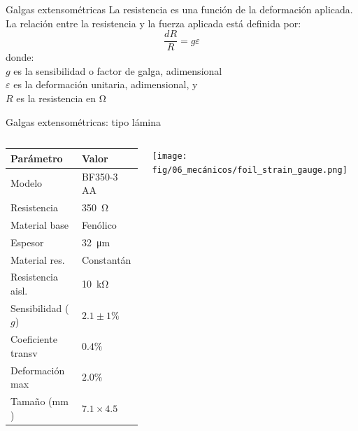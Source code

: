 \documentclass[aspectratio=169]{beamer}
\begin{document}
\begin{frame}[t]{Galgas extensométricas}
    La resistencia es una función de la deformación aplicada.
    La relación entre la resistencia y la fuerza aplicada está definida por:
    \begin{equation*}
        \dfrac{dR}{R} = g \varepsilon
    \end{equation*}
    donde:\\
    $g$ es la sensibilidad o factor de galga, adimensional\\
    $\varepsilon$ es la deformación unitaria, adimensional, y\\
    $R$ es la resistencia en $\si{\ohm}$
\end{frame}

\begin{frame}{Galgas extensométricas: tipo lámina}
    \begin{columns}[c, onlytextwidth]
        \begin{column}{0.55\textwidth}
            \begin{tabular}{ll}
            \toprule
            \textbf{Parámetro} & \textbf{Valor} \\
            \midrule
            Modelo & BF350-3 AA \\
            Resistencia & \SI{350}{\ohm} \\
            Material base & Fenólico \\
            Espesor & \SI{32}{\micro\meter} \\
            Material res. & Constantán \\
            Resistencia aisl. & \SI{10}{\kilo\ohm}\\
            Sensibilidad ($g$) & $2.1 \pm 1\%$\\
            Coeficiente transv & $0.4\%$ \\
            Deformación max & $2.0\%$ \\
            Tamaño ($\si{\milli\meter}$) & $7.1 \times 4.5$ \\
            \bottomrule
            \end{tabular}
        \end{column}
        \begin{column}{0.45\textwidth}
        \centering
        \texttt{[image: fig/06\_mecánicos/foil\_strain\_gauge.png]}
        \end{column}
    \end{columns}
\end{frame}
\end{document}
